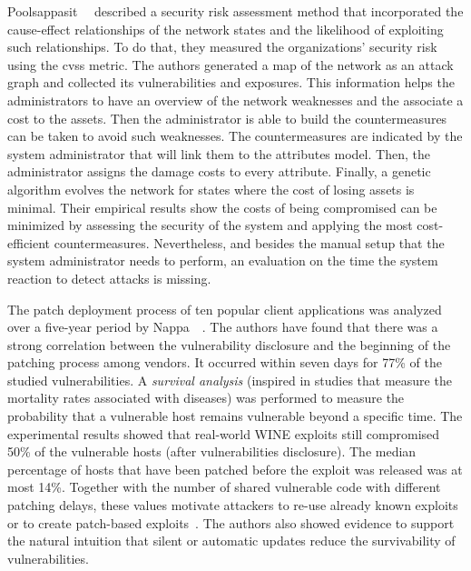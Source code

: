 Poolsappasit~\etal{}~\cite{Poolsappasit:2012} described a security risk assessment method that incorporated the cause-effect relationships of the network states and the likelihood of exploiting such relationships.
To do that, they measured the organizations' security risk using the \gls{cvss} metric.
The authors generated a map of the network as an attack graph and collected its vulnerabilities and exposures. 
This information helps the administrators to have an overview of the network weaknesses and the associate a cost to the assets.
Then the administrator is able to build the countermeasures can be taken to avoid such weaknesses.
The countermeasures are indicated by the system administrator that will link them to the attributes model.
Then, the administrator assigns the damage costs to every attribute.
Finally, a genetic algorithm evolves the network for states where the cost of losing assets is minimal. 
Their empirical results show the costs of being compromised can be minimized by assessing the security of the system and applying the most cost-efficient countermeasures.
Nevertheless, and besides the manual setup that the system administrator needs to perform, an evaluation on the time the system reaction to detect attacks is missing.


The patch deployment process of ten popular client applications was analyzed over a five-year period by Nappa~\etal{}~\cite{Nappa:2015}.
The authors have found that there was a strong correlation between the vulnerability disclosure and the beginning of the patching process among vendors.
It occurred within seven days for 77\% of the studied vulnerabilities.
A \emph{survival analysis} (inspired in studies that measure the mortality rates associated with diseases) was performed to measure the probability that a vulnerable host remains vulnerable beyond a specific time.
The experimental results showed that real-world WINE exploits still compromised 50\% of the vulnerable hosts (after vulnerabilities disclosure). 
The median percentage of hosts that have been patched before the exploit was released was at most 14\%.
Together with the number of shared vulnerable code with different patching delays, these values motivate attackers to re-use already known exploits or to create patch-based exploits~\cite{Brumley:2008}.
The authors also showed evidence to support the natural intuition that silent or automatic updates reduce the survivability of vulnerabilities. 



